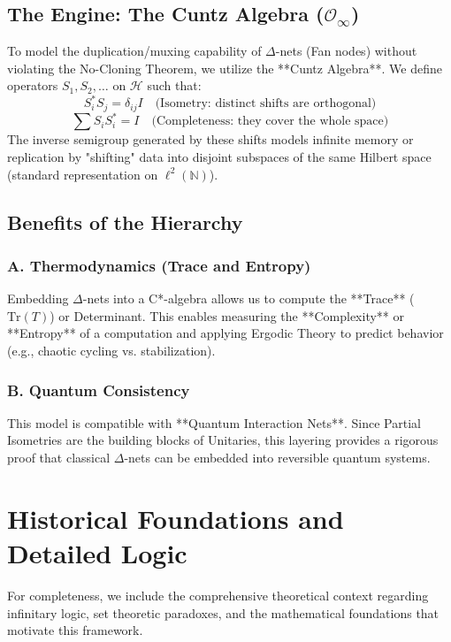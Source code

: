 \documentclass{stex}
\begin{document}
\subsection{The Engine: The Cuntz Algebra ($\mathcal{O}_\infty$)}
To model the duplication/muxing capability of $\Delta$-nets (Fan nodes) without violating the No-Cloning Theorem, we utilize the **Cuntz Algebra**. We define operators $S_1, S_2, \dots$ on $\mathcal{H}$ such that:
\begin{equation}
S_i^* S_j = \delta_{ij} I \quad \text{(Isometry: distinct shifts are orthogonal)}
\end{equation}
\begin{equation}
\sum S_i S_i^* = I \quad \text{(Completeness: they cover the whole space)}
\end{equation}
The inverse semigroup generated by these shifts models infinite memory or replication by "shifting" data into disjoint subspaces of the same Hilbert space (standard representation on $\ell^2(\mathbb{N})$).

\subsection{Benefits of the Hierarchy}
\subsubsection{A. Thermodynamics (Trace and Entropy)}
Embedding $\Delta$-nets into a C*-algebra allows us to compute the **Trace** ($\text{Tr}(T)$) or Determinant. This enables measuring the **Complexity** or **Entropy** of a computation and applying Ergodic Theory to predict behavior (e.g., chaotic cycling vs. stabilization).

\subsubsection{B. Quantum Consistency}
This model is compatible with **Quantum Interaction Nets**. Since Partial Isometries are the building blocks of Unitaries, this layering provides a rigorous proof that classical $\Delta$-nets can be embedded into reversible quantum systems.

\appendix
\section{Historical Foundations and Detailed Logic}

For completeness, we include the comprehensive theoretical context regarding infinitary logic, set theoretic paradoxes, and the mathematical foundations that motivate this framework.
\end{document}
